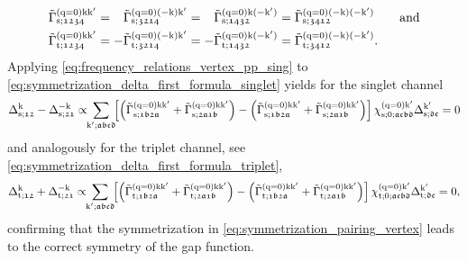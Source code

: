 \documentclass[main.tex]{subfiles}
\begin{document}
\begin{subequations}\label{eq:frequency_relations_vertex_pp_sing_trip}
\begin{align}
	\tilde{\Gamma}_{\text{s};\mathfrak{1234}}^{(\text{q}=0)\text{k}\text{k}'}&=\phantom{-}\tilde{\Gamma}_{\text{s};\mathfrak{3214}}^{(\text{q}=0)(-\text{k})\text{k}'}=\phantom{-}\tilde{\Gamma}_{\text{s};\mathfrak{1432}}^{(\text{q}=0)\text{k}(-\text{k}')}=\tilde{\Gamma}_{\text{s};\mathfrak{3412}}^{(\text{q}=0)(-\text{k})(-\text{k}')}\label{eq:frequency_relations_vertex_pp_sing}\qquad\text{and}\\ 
	\tilde{\Gamma}_{\text{t};\mathfrak{1234}}^{(\text{q}=0)\text{k}\text{k}'}&=-\tilde{\Gamma}_{\text{t};\mathfrak{3214}}^{(\text{q}=0)(-\text{k})\text{k}'}=-\tilde{\Gamma}_{\text{t};\mathfrak{1432}}^{(\text{q}=0)\text{k}(-\text{k}')}=\tilde{\Gamma}_{\text{t};\mathfrak{3412}}^{(\text{q}=0)(-\text{k})(-\text{k}')}.\label{eq:frequency_relations_vertex_pp_trip}
\end{align}
\end{subequations}
Applying \eqref{eq:frequency_relations_vertex_pp_sing} to \eqref{eq:symmetrization_delta_first_formula_singlet} yields for the singlet channel
\begin{align}
	\Delta_{\text{s};\mathfrak{12}}^{\text{k}}-\Delta_{\text{s};\mathfrak{21}}^{-\text{k}}\propto\!\!\sum_{\text{k}';\mathfrak{abcd}}\!\! \left [\left (\tilde{\Gamma}^{(\text{q}=0)\text{k}\text{k}'}_{\text{s};\mathfrak{1b2a}}+\tilde{\Gamma}^{(\text{q}=0)\text{k}\text{k}'}_{\text{s};\mathfrak{2a1b}}\right )-\left(\tilde{\Gamma}^{(\text{q}=0)\text{k}\text{k}'}_{\text{s};\mathfrak{1b2a}}+\tilde{\Gamma}^{(\text{q}=0)\text{k}\text{k}'}_{\text{s};\mathfrak{2a1b}}\right )\right ]\chi^{(\text{q}=0)\text{k}'}_{\text{s};0;\mathfrak{acbd}}\Delta_{\text{s};\mathfrak{dc}}^{\text{k}'}=0
\end{align}
and analogously for the triplet channel, see \eqref{eq:symmetrization_delta_first_formula_triplet},
\begin{align}
	\Delta_{\text{t};\mathfrak{12}}^{\text{k}}+\Delta_{\text{t};\mathfrak{21}}^{-\text{k}}\propto\!\!\sum_{\text{k}';\mathfrak{abcd}}\!\! \left [\left (\tilde{\Gamma}^{(\text{q}=0)\text{k}\text{k}'}_{\text{t};\mathfrak{1b2a}}+\tilde{\Gamma}^{(\text{q}=0)\text{k}\text{k}'}_{\text{t};\mathfrak{2a1b}}\right )-\left(\tilde{\Gamma}^{(\text{q}=0)\text{k}\text{k}'}_{\text{t};\mathfrak{1b2a}}+\tilde{\Gamma}^{(\text{q}=0)\text{k}\text{k}'}_{\text{t};\mathfrak{2a1b}}\right )\right ]\chi^{(\text{q}=0)\text{k}'}_{\text{t};0;\mathfrak{acbd}}\Delta_{\text{t};\mathfrak{dc}}^{\text{k}'}=0,
\end{align}
confirming that the symmetrization in \eqref{eq:symmetrization_pairing_vertex} leads to the correct symmetry of the gap function.
\end{document}
